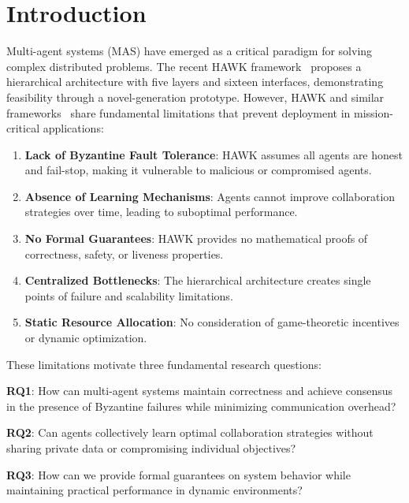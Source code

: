 \documentclass[conference]{IEEEtran}
\begin{document}
\section{Introduction}

Multi-agent systems (MAS) have emerged as a critical paradigm for solving complex distributed problems. The recent HAWK framework~\cite{hawk2025} proposes a hierarchical architecture with five layers and sixteen interfaces, demonstrating feasibility through a novel-generation prototype. However, HAWK and similar frameworks~\cite{langgraph2024, crewai2024, wu2023autogen} share fundamental limitations that prevent deployment in mission-critical applications:

\begin{enumerate}
    \item \textbf{Lack of Byzantine Fault Tolerance}: HAWK assumes all agents are honest and fail-stop, making it vulnerable to malicious or compromised agents.
    
    \item \textbf{Absence of Learning Mechanisms}: Agents cannot improve collaboration strategies over time, leading to suboptimal performance.
    
    \item \textbf{No Formal Guarantees}: HAWK provides no mathematical proofs of correctness, safety, or liveness properties.
    
    \item \textbf{Centralized Bottlenecks}: The hierarchical architecture creates single points of failure and scalability limitations.
    
    \item \textbf{Static Resource Allocation}: No consideration of game-theoretic incentives or dynamic optimization.
\end{enumerate}

These limitations motivate three fundamental research questions:

\textbf{RQ1}: How can multi-agent systems maintain correctness and achieve consensus in the presence of Byzantine failures while minimizing communication overhead?

\textbf{RQ2}: Can agents collectively learn optimal collaboration strategies without sharing private data or compromising individual objectives?

\textbf{RQ3}: How can we provide formal guarantees on system behavior while maintaining practical performance in dynamic environments?
\end{document}
